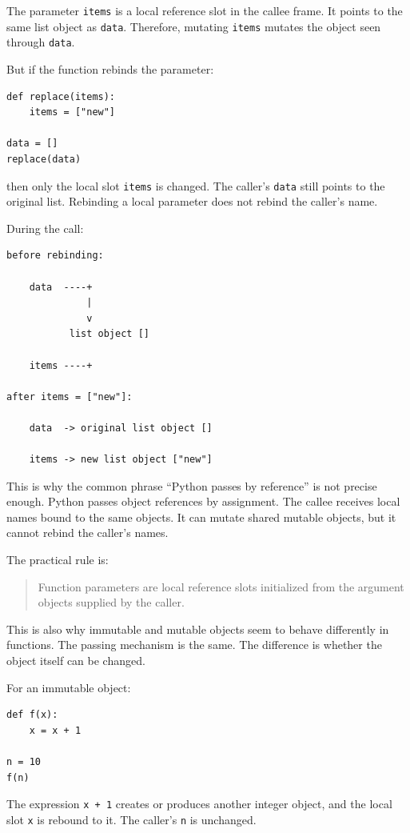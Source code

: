 The parameter \texttt{items} is a local reference slot in the callee frame. It points to the same list object as \texttt{data}. Therefore, mutating \texttt{items} mutates the object seen through \texttt{data}.

But if the function rebinds the parameter:

\begin{verbatim}
def replace(items):
    items = ["new"]

data = []
replace(data)
\end{verbatim}

then only the local slot \texttt{items} is changed. The caller's \texttt{data} still points to the original list. Rebinding a local parameter does not rebind the caller's name.

During the call:

\begin{verbatim}
before rebinding:

    data  ----+
              |
              v
           list object []

    items ----+

after items = ["new"]:

    data  -> original list object []

    items -> new list object ["new"]
\end{verbatim}

This is why the common phrase ``Python passes by reference'' is not precise enough. Python passes object references by assignment. The callee receives local names bound to the same objects. It can mutate shared mutable objects, but it cannot rebind the caller's names.

The practical rule is:

\begin{quote}
Function parameters are local reference slots initialized from the argument objects supplied by the caller.
\end{quote}

This is also why immutable and mutable objects seem to behave differently in functions. The passing mechanism is the same. The difference is whether the object itself can be changed.

For an immutable object:

\begin{verbatim}
def f(x):
    x = x + 1

n = 10
f(n)
\end{verbatim}

The expression \texttt{x + 1} creates or produces another integer object, and the local slot \texttt{x} is rebound to it. The caller's \texttt{n} is unchanged.


